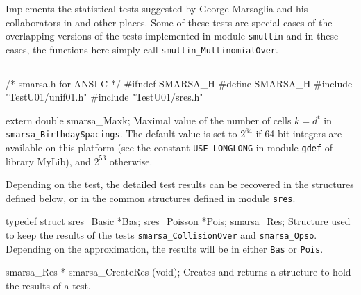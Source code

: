 
Implements the statistical tests suggested by George Marsaglia and his
collaborators in \cite{rMAR85a} and other places.
Some of these tests are special cases of the overlapping versions of the
tests implemented in module {\tt smultin} and in these cases, the 
functions here simply call  {\tt smultin\_MultinomialOver}.
\resdef



\iffalse  %
For all these tests, when $N>1$, we may apply a two-level test 
over the  $N$ $p$-values obtained at the first level.
For $N=1$, we simply compute the $p$-value of the first level test;
$n$ is the sample size of the first level test.
We also drop the first $r$ bits (the most significant, 
$r \ge 0$) of each generated random number and apply the tests on
 the remaining bits.
\fi  %

\bigskip\hrule

\code\hide
/* smarsa.h for ANSI C */
#ifndef SMARSA_H
#define SMARSA_H
\endhide
#include "TestU01/unif01.h"
#include "TestU01/sres.h"
\endcode

\ifdetailed  %


\code

extern double smarsa_Maxk;
\endcode
\tab
   Maximal value of the number of cells $k = d^t$ in
   {\tt smarsa\_BirthdaySpacings}.
   The  default value is set to $2^{64}$ if 64-bit integers are available
   on this platform (see the constant {\tt USE\_LONGLONG} in module
   {\tt gdef} of library MyLib), and $2^{53}$ otherwise.
\endtab




Depending on the test, the detailed test results can be recovered in the
structures defined below, or in the common structures defined in module
 {\tt sres}.

\code

typedef struct {
   sres_Basic *Bas;
   sres_Poisson *Pois;
} smarsa_Res;
\endcode
 \tab
  Structure used to keep the results of the tests
  {\tt smarsa\_CollisionOver} and  {\tt smarsa\_Opso}.
  Depending on the approximation, the results will be in either {\tt Bas}
  or  {\tt Pois}.
 \endtab
\code


smarsa_Res * smarsa_CreateRes (void);
\endcode
 \tab 
  Creates and returns a structure to hold the results of a test. 
 \endtab
\code


